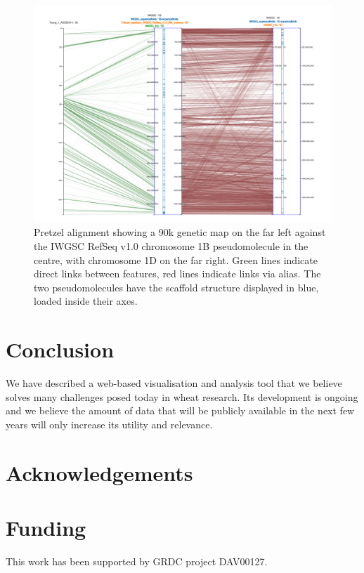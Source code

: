 \documentclass{bioinfo}
\begin{document}
\begin{figure}[!tpb]%
\centering
\includegraphics[width=.5\textwidth]{pretzel.png}
\caption{
  Pretzel alignment showing a 90k genetic map on the far left against the IWGSC RefSeq v1.0 chromosome 1B pseudomolecule in the centre, 
  with chromosome 1D on the far right. 
  Green lines indicate direct links between features, red lines indicate links via alias. 
  The two pseudomolecules have the scaffold structure displayed in blue, loaded inside their axes.
}
\label{fig:01}
\end{figure}


%
%






\section{Conclusion}

We have described a web-based visualisation and analysis tool that we believe solves many challenges posed today in wheat research. 
Its development is ongoing and we believe the amount of data that will be publicly available in the next few years will only increase its utility and relevance.

\section*{Acknowledgements}



\section*{Funding}

This work has been supported by GRDC project DAV00127.\vspace*{-12pt}




\end{document}
